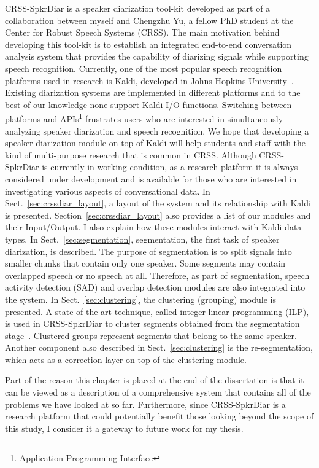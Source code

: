 CRSS-SpkrDiar is a speaker diarization tool-kit developed as part of a collaboration between myself and Chengzhu Yu, a fellow PhD student at the Center for Robust Speech Systems (CRSS). 
The main motivation behind developing this tool-kit is to establish an integrated end-to-end conversation analysis system that provides the capability of diarizing  signals while supporting speech recognition. 
Currently, one of the most popular speech recognition platforms used in research is Kaldi, developed in Johns Hopkins University~\cite{kaldi}. 
Existing diarization systems are implemented in different platforms and to the best of our knowledge none support Kaldi I/O functions. 
Switching between platforms and APIs\footnote{Application Programming Interface} frustrates users who are interested in simultaneously analyzing speaker diarization and speech recognition. 
We hope that developing a speaker diarization module on top of Kaldi will help students and staff with the kind of multi-purpose research that is common in CRSS. 
Although CRSS-SpkrDiar is currently in working condition, as a research platform it is always considered under development and is available for those who are interested in investigating various aspects of conversational data. 
In Sect.~\ref{sec:crssdiar_layout}, a layout of the system and its relationship with Kaldi is presented. 
Section~\ref{sec:crssdiar_layout} also provides a list of our modules and their Input/Output. 
I also explain how these modules interact with Kaldi data types. 
In Sect.~\ref{sec:segmentation}, segmentation, the first task of speaker diarization, is described. 
The purpose of segmentation is to split signals into smaller chunks that contain only one speaker. 
Some segments may contain overlapped speech or no speech at all. 
Therefore, as part of segmentation, speech activity detection (SAD) and overlap detection modules are also integrated into the system. 
In Sect.~\ref{sec:clustering}, the clustering (grouping) module is presented. 
A state-of-the-art technique, called integer linear programming (ILP), is used in CRSS-SpkrDiar to cluster segments obtained from the segmentation stage~\cite{bredin2013ILP}. 
Clustered groups represent segments that belong to the same speaker. Another component also described in Sect.~\ref{sec:clustering} is the re-segmentation, which acts as a correction layer on top of the clustering module. 

Part of the reason this chapter is placed at the end of the dissertation is that it can be viewed as a description of a comprehensive system that contains all of the problems we have looked at so far. 
Furthermore, since CRSS-SpkrDiar is a research platform that could potentially benefit those looking beyond the scope of this study, I consider it a gateway to future work for my thesis. 



